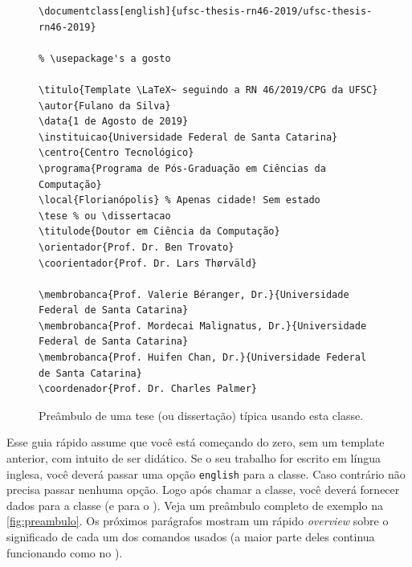 \documentclass[embeddedlogo]{../ufsc-thesis-rn46-2019}
\begin{document}
\begin{figure}[tb]
  \centering
  \caption{Preâmbulo de uma tese (ou dissertação) típica usando esta classe.}
  \label{fig:preambulo}

  \begin{verbatim}
\documentclass[english]{ufsc-thesis-rn46-2019/ufsc-thesis-rn46-2019}

% \usepackage's a gosto

\titulo{Template \LaTeX~ seguindo a RN 46/2019/CPG da UFSC}
\autor{Fulano da Silva}
\data{1 de Agosto de 2019}
\instituicao{Universidade Federal de Santa Catarina}
\centro{Centro Tecnológico}
\programa{Programa de Pós-Graduação em Ciências da Computação}
\local{Florianópolis} % Apenas cidade! Sem estado
\tese % ou \dissertacao
\titulode{Doutor em Ciência da Computação}
\orientador{Prof. Dr. Ben Trovato}
\coorientador{Prof. Dr. Lars Thørväld}

\membrobanca{Prof. Valerie Béranger, Dr.}{Universidade Federal de Santa Catarina}
\membrobanca{Prof. Mordecai Malignatus, Dr.}{Universidade Federal de Santa Catarina}
\membrobanca{Prof. Huifen Chan, Dr.}{Universidade Federal de Santa Catarina}
\coordenador{Prof. Dr. Charles Palmer}
  \end{verbatim}
\end{figure}

Esse guia rápido assume que você está começando do zero, sem um template
anterior, com intuito de ser didático. Se o seu trabalho for escrito em língua
inglesa, você deverá passar uma opção \texttt{english} para a classe. Caso
contrário não precisa passar nenhuma opção. Logo após chamar a classe, você
deverá fornecer dados para a classe (e para o \abnTeX). Veja um preâmbulo
completo de exemplo na \autoref{fig:preambulo}. Os próximos parágrafos mostram um
rápido \emph{overview} sobre o significado de cada um dos comandos usados (a
maior parte deles continua funcionando como no \abnTeX).
\end{document}
